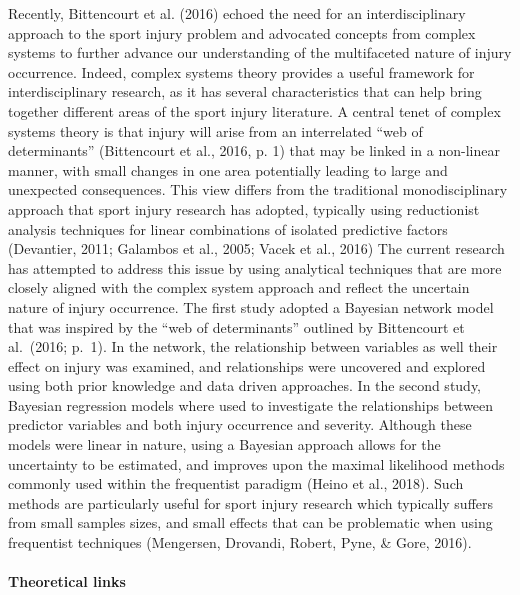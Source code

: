 \documentclass[man,floatsintext]{apa6}
\let\oldparagraph\paragraph
\renewcommand{\paragraph}[1]{\oldparagraph{#1}\mbox{}}
\begin{document}
Recently, Bittencourt et al. (2016) echoed the need for an interdisciplinary approach to the sport injury problem and advocated concepts from complex systems to further advance our understanding of the multifaceted nature of injury occurrence.
Indeed, complex systems theory provides a useful framework for interdisciplinary research, as it has several characteristics that can help bring together different areas of the sport injury literature.
A central tenet of complex systems theory is that injury will arise from an interrelated \enquote{web of determinants} (Bittencourt et al., 2016, p. 1) that may be linked in a non-linear manner, with small changes in one area potentially leading to large and unexpected consequences.
This view differs from the traditional monodisciplinary approach that sport injury research has adopted, typically using reductionist analysis techniques for linear combinations of isolated predictive factors (Devantier, 2011; Galambos et al., 2005; Vacek et al., 2016)
The current research has attempted to address this issue by using analytical techniques that are more closely aligned with the complex system approach and reflect the uncertain nature of injury occurrence.
The first study adopted a Bayesian network model that was inspired by the \enquote{web of determinants} outlined by Bittencourt et al.~(2016; p.~1).
In the network, the relationship between variables as well their effect on injury was examined, and relationships were uncovered and explored using both prior knowledge and data driven approaches.
In the second study, Bayesian regression models where used to investigate the relationships between predictor variables and both injury occurrence and severity.
Although these models were linear in nature, using a Bayesian approach allows for the uncertainty to be estimated, and improves upon the maximal likelihood methods commonly used within the frequentist paradigm (Heino et al., 2018).
Such methods are particularly useful for sport injury research which typically suffers from small samples sizes, and small effects that can be problematic when using frequentist techniques (Mengersen, Drovandi, Robert, Pyne, \& Gore, 2016).

\hypertarget{theoretical-links}{%
\paragraph{Theoretical links}\label{theoretical-links}}
\end{document}
